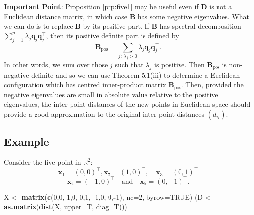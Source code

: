 \documentclass[]{book}
\newenvironment{Shaded}{\begin{snugshade}}{\end{snugshade}}
\newcommand{\DataTypeTok}[1]{\textcolor[rgb]{0.13,0.29,0.53}{#1}}
\newcommand{\DecValTok}[1]{\textcolor[rgb]{0.00,0.00,0.81}{#1}}
\newcommand{\KeywordTok}[1]{\textcolor[rgb]{0.13,0.29,0.53}{\textbf{#1}}}
\newcommand{\NormalTok}[1]{#1}
\newcommand{\OperatorTok}[1]{\textcolor[rgb]{0.81,0.36,0.00}{\textbf{#1}}}
\newcommand{\OtherTok}[1]{\textcolor[rgb]{0.56,0.35,0.01}{#1}}
\newcommand{\StringTok}[1]{\textcolor[rgb]{0.31,0.60,0.02}{#1}}
\theoremstyle{definition}
\theoremstyle{definition}
\theoremstyle{definition}
\theoremstyle{remark}
\begin{document}
\textbf{Important Point}: Proposition \ref{prp:five1} may be useful even if \({\mathbf D}\) is not a Euclidean distance matrix, in which case \(\boldsymbol B\) has some negative eigenvalues. What we can do is to replace \(\boldsymbol B\) by its positive part. If \(\boldsymbol B\) has spectral decomposition \(\sum_{j=1}^p \lambda_j \boldsymbol q_j \boldsymbol q_j^\top\), then its positive definite part is defined by
\[
\boldsymbol B_{\text{pos}}=\sum_{j: \, \lambda_j>0} \lambda_j \boldsymbol q_j \boldsymbol q_j^\top.
\]
In other words, we sum over those \(j\) such that \(\lambda_j\) is positive.
Then \(\boldsymbol B_{\text{pos}}\) is non-negative definite and so we can use Theorem 5.1(iii) to determine a Euclidean configuration which has centred inner-product matrix \(\boldsymbol B_{\text{pos}}\). Then, provided the negative eigenvalues are small in absolute value relative to the positive eigenvalues, the inter-point distances of the new points in Euclidean space should provide a good approximation to the original inter-point distances \((d_{ij})\).

\hypertarget{example-1}{%
\subsection{Example}\label{example-1}}

Consider the five point in \(\mathbb{R}^2\):
\[
\boldsymbol x_1=(0,0)^\top,  \boldsymbol x_2 =(1,0)^\top, \quad \boldsymbol x_3 =(0,1)^\top
\]
\[
\boldsymbol x_4 =(-1,0)^\top \quad \text{and} \quad \boldsymbol x_5=(0,-1)^\top.
\]

\begin{Shaded}
\begin{Highlighting}[]
\NormalTok{X <-}\StringTok{ }\KeywordTok{matrix}\NormalTok{(}\KeywordTok{c}\NormalTok{(}\DecValTok{0}\NormalTok{,}\DecValTok{0}\NormalTok{,}
              \DecValTok{1}\NormalTok{,}\DecValTok{0}\NormalTok{,}
              \DecValTok{0}\NormalTok{,}\DecValTok{1}\NormalTok{,}
              \DecValTok{-1}\NormalTok{,}\DecValTok{0}\NormalTok{,}
              \DecValTok{0}\NormalTok{,}\OperatorTok{-}\DecValTok{1}\NormalTok{), }\DataTypeTok{nc=}\DecValTok{2}\NormalTok{, }\DataTypeTok{byrow=}\OtherTok{TRUE}\NormalTok{)}
\NormalTok{(D <-}\StringTok{ }\KeywordTok{as.matrix}\NormalTok{(}\KeywordTok{dist}\NormalTok{(X, }\DataTypeTok{upper=}\NormalTok{T, }\DataTypeTok{diag=}\NormalTok{T)))}
\end{Highlighting}
\end{Shaded}
\end{document}
